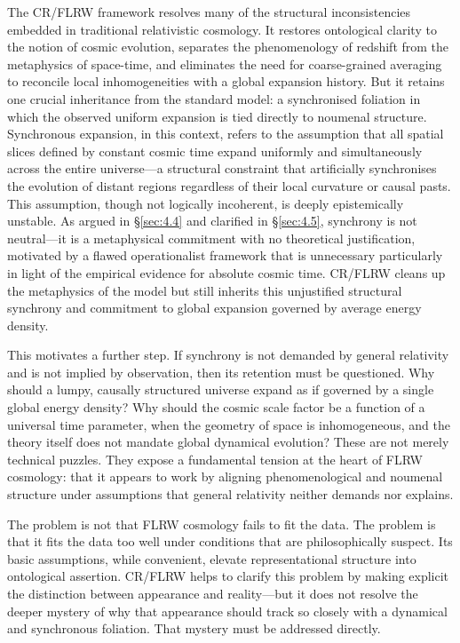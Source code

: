 \documentclass[12pt]{book}
\begin{document}
\vspace{4pt}

The CR/FLRW framework resolves many of the structural inconsistencies embedded in traditional relativistic cosmology. It restores ontological clarity to the notion of cosmic evolution, separates the phenomenology of redshift from the metaphysics of space-time, and eliminates the need for coarse-grained averaging to reconcile local inhomogeneities with a global expansion history. But it retains one crucial inheritance from the standard model: a synchronised foliation in which the observed uniform expansion is tied directly to noumenal structure. Synchronous expansion, in this context, refers to the assumption that all spatial slices defined by constant cosmic time expand uniformly and simultaneously across the entire universe---a structural constraint that artificially synchronises the evolution of distant regions regardless of their local curvature or causal pasts. This assumption, though not logically incoherent, is deeply epistemically unstable. As argued in \S\ref{sec:4.4} and clarified in \S\ref{sec:4.5}, synchrony is not neutral---it is a metaphysical commitment with no theoretical justification, motivated by a flawed operationalist framework that is unnecessary particularly in light of the empirical evidence for absolute cosmic time. CR/FLRW cleans up the metaphysics of the model but still inherits this unjustified structural synchrony and commitment to global expansion governed by average energy density.

This motivates a further step. If synchrony is not demanded by general relativity and is not implied by observation, then its retention must be questioned. Why should a lumpy, causally structured universe expand as if governed by a single global energy density? Why should the cosmic scale factor be a function of a universal time parameter, when the geometry of space is inhomogeneous, and the theory itself does not mandate global dynamical evolution? These are not merely technical puzzles. They expose a fundamental tension at the heart of FLRW cosmology: that it appears to work by aligning phenomenological and noumenal structure under assumptions that general relativity neither demands nor explains.

The problem is not that FLRW cosmology fails to fit the data. The problem is that it fits the data too well under conditions that are philosophically suspect. Its basic assumptions, while convenient, elevate representational structure into ontological assertion. CR/FLRW helps to clarify this problem by making explicit the distinction between appearance and reality---but it does not resolve the deeper mystery of why that appearance should track so closely with a dynamical and synchronous foliation. That mystery must be addressed directly.
\end{document}

